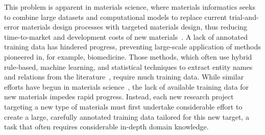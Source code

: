 
This problem is apparent in materials science, where materials informatics 
seeks to combine large datasets and computational models to 
replace current trial-and-error materials design processes with targeted materials design, 
thus reducing time-to-market and development costs of new materials~\cite{MGI2014}.
A lack of annotated training data has hindered progress,
preventing large-scale application of methods pioneered in, for example,
biomedicine.
Those methods, which often use hybrid rule-based, machine learning, and statistical techniques to extract entity names and relations from the literature~\cite{leaman2008banner,zeng2015survey}, require much training data.
While similar efforts have begun in materials science~\cite{hawizy2011chemicaltagger,rocktaschel2012chemspot,leaman2015tmchem,swain2016chemdataextractor,young2018data}, the lack of available training data for new materials impedes rapid progress. 
Instead, each new research project targeting a new type of materials must first undertake considerable
effort to create a large, carefully annotated training
data tailored for this new target, a task that often requires considerable in-depth domain knowledge.


